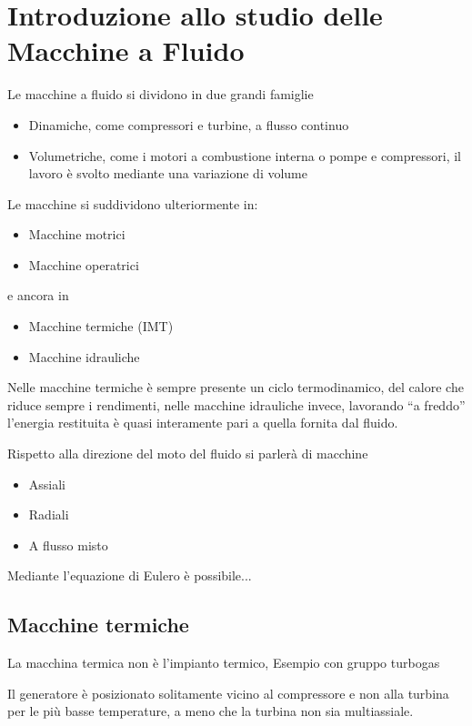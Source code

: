 
\chapter{Introduzione allo studio delle Macchine a Fluido}

Le macchine a fluido si dividono in due grandi famiglie
\begin{itemize}
\item Dinamiche, come compressori e turbine, a flusso continuo

\item Volumetriche, come i motori a combustione interna o pompe e compressori,
il lavoro è svolto mediante una variazione di volume
\end{itemize}

Le macchine si suddividono ulteriormente in:
\begin{itemize}
\item Macchine motrici
\item Macchine operatrici
\end{itemize}
 e ancora in
\begin{itemize}
\item Macchine termiche (IMT)
\item Macchine idrauliche
\end{itemize}

Nelle macchine termiche è sempre presente un ciclo termodinamico, del calore
che riduce sempre i rendimenti, nelle macchine idrauliche invece, lavorando ``a
freddo'' l'energia restituita è quasi interamente pari a quella fornita dal
fluido.

Rispetto alla direzione del moto del fluido si parlerà di macchine
\begin{itemize}
\item Assiali
\item Radiali
\item A flusso misto
\end{itemize}

Mediante l'equazione di Eulero è possibile...

\section{Macchine termiche}
La macchina termica non è l'impianto termico,
Esempio con gruppo turbogas

Il generatore è posizionato solitamente vicino al compressore e non alla
turbina per le più basse temperature, a meno che la turbina non sia
multiassiale.

